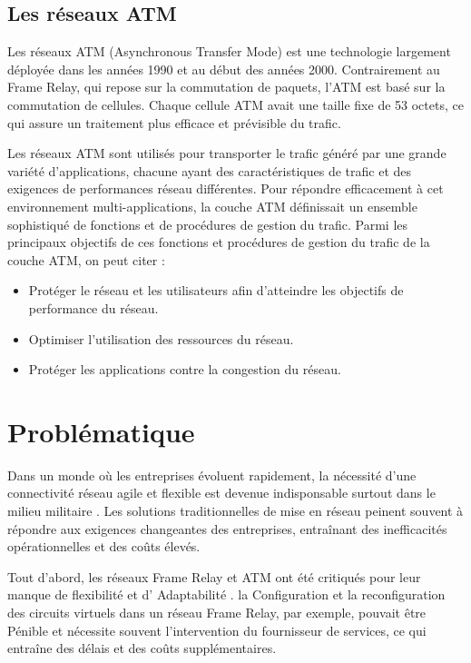   \subsection{Les réseaux ATM }
  
  Les réseaux ATM (Asynchronous Transfer Mode) est une technologie largement déployée dans les années 1990 et au début des années 2000. Contrairement au Frame Relay, qui repose sur la commutation de paquets, l'ATM est basé sur la commutation de cellules. Chaque cellule ATM avait une taille fixe de 53 octets, ce qui assure un traitement plus efficace et prévisible du trafic.
  
  Les réseaux ATM sont utilisés pour transporter le trafic généré par une grande variété d'applications, chacune ayant des caractéristiques de trafic et des exigences de performances réseau différentes. 
  Pour répondre efficacement à cet environnement multi-applications, la couche ATM définissait un ensemble sophistiqué de fonctions et de procédures de gestion du trafic.
  Parmi les principaux objectifs de ces fonctions et procédures de gestion du trafic de la couche ATM, on peut citer :
  \begin{itemize}
  \item Protéger le réseau et les utilisateurs afin d'atteindre les objectifs de performance du réseau.
  \item Optimiser l'utilisation des ressources du réseau.
  \item Protéger les applications contre la congestion du réseau.
\end{itemize}
\section{Problématique}

Dans un monde où les entreprises évoluent rapidement, la nécessité d'une connectivité réseau agile et flexible est devenue indisponsable surtout dans le milieu militaire . 
Les solutions traditionnelles de mise en réseau peinent souvent à répondre aux exigences changeantes des entreprises, entraînant des inefficacités opérationnelles et des coûts élevés. 

Tout d'abord, les réseaux Frame Relay et ATM ont été critiqués pour leur manque de flexibilité et d’ Adaptabilité . la Configuration et la reconfiguration des circuits virtuels dans un réseau Frame Relay, par exemple, pouvait être Pénible et nécessite souvent l'intervention du fournisseur de services, ce qui entraîne des délais et des coûts supplémentaires.


